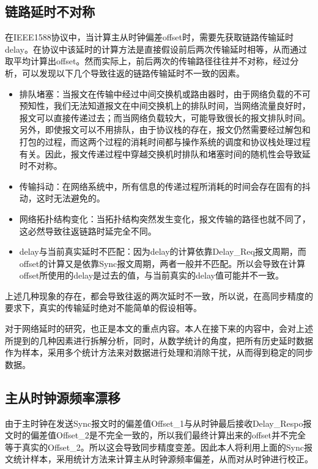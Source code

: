 \subsection{链路延时不对称}
\label{sec:1588_problem_1}
在IEEE1588协议中，当计算主从时钟偏差offset时，需要先获取链路传输延时delay。在协议中该延时的计算方法是直接假设前后两次传输延时相等，从而通过取平均计算出offset。然而实际上，前后两次的传输路径往往并不对称，经过分析，可以发现以下几个导致往返的链路传输延时不一致的因素\supercite{55}。
\begin{itemize}[noitemsep,topsep=0pt,parsep=0pt,partopsep=0pt]
	\item 排队堵塞：当报文在传输中经过中间交换机或路由器时，由于网络负载的不可预知性，我们无法知道报文在中间交换机上的排队时间，当网络流量良好时，报文可以直接传递过去；而当网络负载较大，可能导致很长的报文排队时间。另外，即使报文可以不用排队，由于协议栈的存在，报文仍然需要经过解包和打包的过程，而这两个过程的消耗时间都与操作系统的调度和协议栈处理过程有关。因此，报文传递过程中穿越交换机时排队和堵塞时间的随机性会导致延时不对称\supercite{46}。
	\item 传输抖动：在网络系统中，所有信息的传递过程所消耗的时间会存在固有的抖动，这时无法避免的。
	\item 网络拓扑结构变化：当拓扑结构突然发生变化，报文传输的路径也就不同了，这必然导致往返链路时延完全不同。
	\item delay与当前真实延时不匹配：因为delay的计算依靠Delay\_Req报文周期，而offset的计算又是依靠Sync报文周期，两者一般并不匹配。所以会导致在计算offset所使用的delay是过去的值，与当前真实的delay值可能并不一致。
\end{itemize}

上述几种现象的存在，都会导致往返的两次延时不一致，所以说，在高同步精度的要求下，真实的传输延时绝对不能简单的假设相等。

对于网络延时的研究，也正是本文的重点内容。本人在接下来的内容中，会对上述所提到的几种因素进行拆解分析，同时，从数学统计的角度，把所有历史延时数据作为样本，采用多个统计方法来对数据进行处理和消除干扰，从而得到稳定的同步数据。

\subsection{主从时钟源频率漂移}
由于主时钟在发送Sync报文时的偏差值Offset\_1与从时钟最后接收Delay\_Respo报文时的偏差值Offset\_2是不完全一致的，所以我们最终计算出来的offset并不完全等于真实的Offset\_2。所以这会导致同步精度变差。因此本人将利用上面的Sync报文统计样本，采用统计方法来计算主从时钟源频率偏差，从而对从时钟进行校正。

